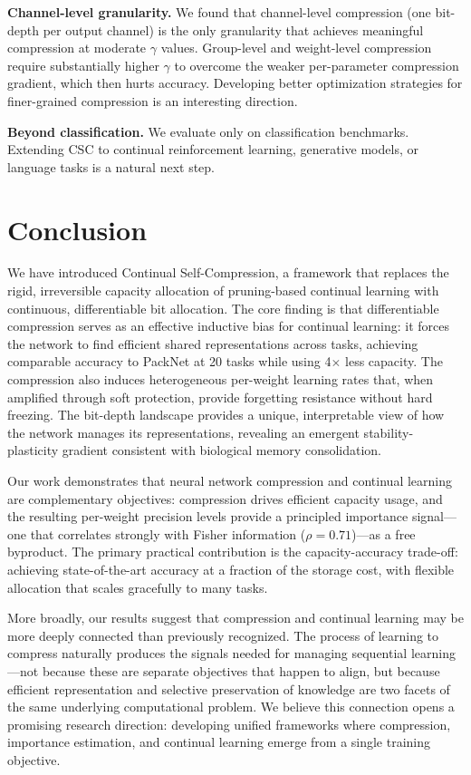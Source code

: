 \documentclass[11pt]{article}
\begin{document}
\textbf{Channel-level granularity.}
We found that channel-level compression (one bit-depth per output channel) is the only granularity that achieves meaningful compression at moderate $\gamma$ values.
Group-level and weight-level compression require substantially higher $\gamma$ to overcome the weaker per-parameter compression gradient, which then hurts accuracy.
Developing better optimization strategies for finer-grained compression is an interesting direction.

\textbf{Beyond classification.}
We evaluate only on classification benchmarks.
Extending CSC to continual reinforcement learning, generative models, or language tasks is a natural next step.

\section{Conclusion}
\label{sec:conclusion}

We have introduced Continual Self-Compression, a framework that replaces the rigid, irreversible capacity allocation of pruning-based continual learning with continuous, differentiable bit allocation.
The core finding is that differentiable compression serves as an effective inductive bias for continual learning: it forces the network to find efficient shared representations across tasks, achieving comparable accuracy to PackNet at 20 tasks while using 4$\times$ less capacity.
The compression also induces heterogeneous per-weight learning rates that, when amplified through soft protection, provide forgetting resistance without hard freezing.
The bit-depth landscape provides a unique, interpretable view of how the network manages its representations, revealing an emergent stability-plasticity gradient consistent with biological memory consolidation.

Our work demonstrates that neural network compression and continual learning are complementary objectives: compression drives efficient capacity usage, and the resulting per-weight precision levels provide a principled importance signal---one that correlates strongly with Fisher information ($\rho = 0.71$)---as a free byproduct.
The primary practical contribution is the capacity-accuracy trade-off: achieving state-of-the-art accuracy at a fraction of the storage cost, with flexible allocation that scales gracefully to many tasks.

More broadly, our results suggest that compression and continual learning may be more deeply connected than previously recognized.
The process of learning to compress naturally produces the signals needed for managing sequential learning---not because these are separate objectives that happen to align, but because efficient representation and selective preservation of knowledge are two facets of the same underlying computational problem.
We believe this connection opens a promising research direction: developing unified frameworks where compression, importance estimation, and continual learning emerge from a single training objective.



\end{document}
